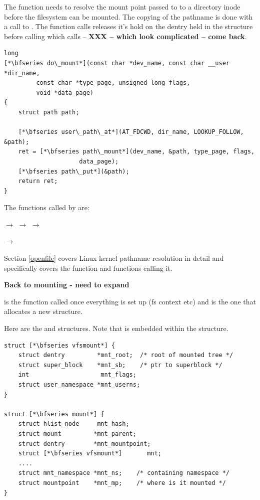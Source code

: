 \noindent
The  function needs to resolve the mount point passed to  to a directory inode before the filesystem can be mounted. The copying of the pathname is done with a call to . The  function calls  releases it's hold on the dentry held in the  structure before calling  which calls  -- \textbf{XXX -- which look complicated -- come back}.

\begin{lstlisting}
long 
[*\bfseries do\_mount*](const char *dev_name, const char __user *dir_name,
         const char *type_page, unsigned long flags, 
         void *data_page)
{
    struct path path;

    [*\bfseries user\_path\_at*](AT_FDCWD, dir_name, LOOKUP_FOLLOW, &path);
    ret = [*\bfseries path\_mount*](dev_name, &path, type_page, flags, 
                     data_page);
    [*\bfseries path\_put*](&path);
    return ret;
}
\end{lstlisting}

\noindent
The functions called by  are:

\small
\vspace{10pt}
\noindent
{} $\rightarrow$  $\rightarrow$  $\rightarrow$

\vspace{1pt}
$\rightarrow$ 

\vspace{10pt}
\normalsize
\noindent
Section \ref{openfile} covers Linux kernel pathname resolution in detail and specifically covers the function  and functions calling it.

\textbf{Back to mounting - need to expand }

 is the function called once everything is set up (fs context etc) and is the one that allocates a new  structure. 

Here are the  and  structures. Note that  is embedded within the  structure.

\begin{lstlisting}
struct [*\bfseries vfsmount*] {
    struct dentry         *mnt_root;  /* root of mounted tree */
    struct super_block    *mnt_sb;    /* ptr to superblock */
    int                    mnt_flags;  
    struct user_namespace *mnt_userns;
}

struct [*\bfseries mount*] {
    struct hlist_node     mnt_hash;
    struct mount         *mnt_parent;
    struct dentry        *mnt_mountpoint;
    struct [*\bfseries vfsmount*]       mnt;
    ....
    struct mnt_namespace *mnt_ns;    /* containing namespace */
    struct mountpoint    *mnt_mp;    /* where is it mounted */
}
\end{lstlisting}

